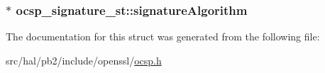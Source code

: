 \subsubsection[{\texorpdfstring{signature\+Algorithm}{signatureAlgorithm}}]{$\ast$ ocsp\+\_\+signature\+\_\+st\+::signature\+Algorithm}\hypertarget{structocsp__signature__st_a6c7ac15576a2cbfeae06fd4d1134d324}{}\label{structocsp__signature__st_a6c7ac15576a2cbfeae06fd4d1134d324}


The documentation for this struct was generated from the following file\+:\begin{DoxyCompactItemize}
\item 
src/hal/pb2/include/openssl/\hyperlink{ocsp_8h}{ocsp.\+h}\end{DoxyCompactItemize}
